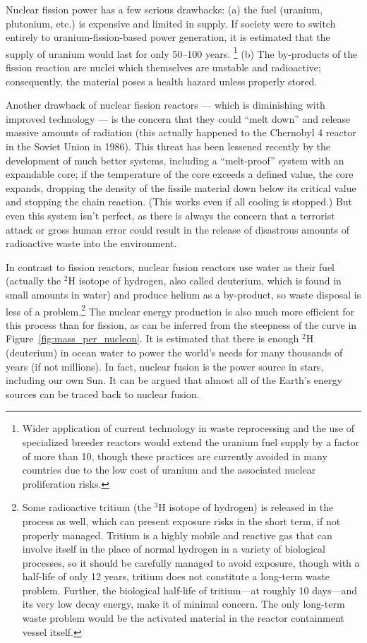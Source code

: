 Nuclear fission power has a few serious drawbacks: (a) the fuel (uranium,
plutonium, etc.) is expensive and limited in supply.  If society were
to switch entirely to uranium-fission-based power generation, it is
estimated that the supply of uranium would last for only 50--100 years.
\footnote{Wider application of current technology in waste reprocessing 
and the use of specialized breeder reactors would extend the uranium fuel 
supply by a factor of more than 10, though these practices are currently 
avoided in many countries due to the low cost of uranium and the associated 
nuclear proliferation risks.} (b) The by-products of the fission reaction 
are nuclei which themselves are unstable and radioactive; consequently, 
the material poses a health hazard unless properly stored.

Another drawback of nuclear fission reactors --- which is diminishing
with improved technology --- is the concern that they could ``melt down''
and release massive amounts of radiation (this actually happened to the
Chernobyl 4 reactor in the Soviet Union in 1986).  This threat has been
lessened recently by the development of much better systems, including a
``melt-proof'' system with an expandable core; if the temperature of the
core exceeds a defined value, the core expands, dropping the density of
the fissile material down below its critical value and stopping the chain
reaction.  (This works even if all cooling is stopped.)  But even this
system isn't perfect, as there is always the concern that a terrorist
attack or gross human error could result in the release of disastrous
amounts of radioactive waste into the environment.

In contrast to fission reactors,  nuclear fusion reactors use water
as their  fuel  (actually the  $^2$H  isotope  of  hydrogen, also
called deuterium,  which is  found in  small  amounts in  water)
and  produce helium   as  a   by-product,  so   waste   disposal  is
less  of   a problem.\footnote{Some radioactive tritium (the $^3$H 
isotope of hydrogen) is released in the process as well, which can 
present exposure risks in the short term, if not properly managed. 
Tritium is a highly mobile and reactive gas that can involve itself 
in the place of normal hydrogen in a variety of biological processes, 
so it should be carefully managed to avoid exposure, though with a 
half-life of only 12 years, tritium does not constitute a long-term 
waste problem. Further, the biological half-life of tritium---at 
roughly 10 days---and its very low decay energy, make it of minimal 
concern. The only long-term waste problem would be the activated
material in the reactor containment vessel itself.}  The nuclear
energy  production is also much more efficient for this  process than
for fission, as can be inferred from the steepness of the curve in
Figure~\ref{fig:mass_per_nucleon}.  It is estimated that there is enough
$^2$H (deuterium) in  ocean water to power the  world's needs for many
thousands of years (if not  millions).  In fact, nuclear fusion is the
power source in  stars, including our own Sun.  It  can be argued that
almost all of the Earth's energy sources can be traced back to nuclear
fusion.

